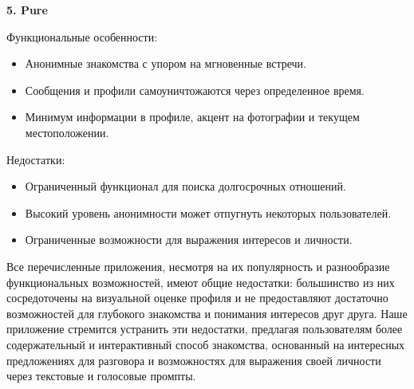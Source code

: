 \textbf{5. Pure}

Функциональные особенности:

\begin{itemize}
    \item Анонимные знакомства с упором на мгновенные встречи.
    \item Сообщения и профили самоуничтожаются через определенное время.
    \item Минимум информации в профиле, акцент на фотографии и текущем местоположении.
\end{itemize}

Недостатки:

\begin{itemize}
    \item Ограниченный функционал для поиска долгосрочных отношений.
    \item Высокий уровень анонимности может отпугнуть некоторых пользователей.
    \item Ограниченные возможности для выражения интересов и личности.
\end{itemize}

Все перечисленные приложения, несмотря на их популярность и разнообразие функциональных возможностей, имеют общие недостатки: большинство из них сосредоточены на визуальной оценке профиля и не предоставляют достаточно возможностей для глубокого знакомства и понимания интересов друг друга. Наше приложение стремится устранить эти недостатки, предлагая пользователям более содержательный и интерактивный способ знакомства, основанный на интересных предложениях для разговора и возможностях для выражения своей личности через текстовые и голосовые промпты.
